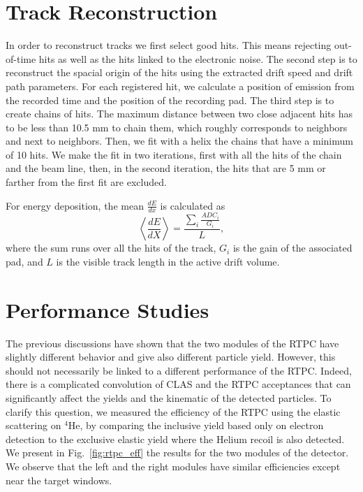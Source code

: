 \documentclass[preprint,5p]{elsarticle}
\begin{document}
\section{Track Reconstruction}\label{sec_rec}
In order to reconstruct tracks we first select good hits. This means rejecting 
out-of-time hits as well as the hits linked to the electronic noise. The second step is 
to reconstruct the spacial origin of the hits using the extracted drift speed and drift path 
parameters. For each registered hit, we calculate a position of emission from 
the recorded time and the position of the recording pad. The third step 
is to create chains of hits. The maximum distance between two close adjacent 
hits has to be less than 10.5 mm to chain them, which roughly corresponds to 
neighbors and next to neighbors. Then, we fit with a helix the chains that have a minimum of 
10 hits. We make the fit in two iterations, first with all the hits of the chain 
and the beam line, then, in the second iteration, 
the hits that are 5 mm or farther from the first fit are excluded.

For energy deposition, the mean $\frac{dE}{dx}$ is calculated as
\begin{equation}
 \left\langle \frac{dE}{dX} \right\rangle= \frac{\sum\limits_{i} \frac{ADC_{i}}{G_i}}{L},
\end{equation}
where the sum runs over all the hits of the track, $G_{i}$ is the gain of 
the associated pad, and $L$ is the visible track length in the active drift 
volume. 

\section{Performance Studies}\label{sec_perfor}

The previous discussions have shown that the two modules of the RTPC have 
slightly different behavior and give also different particle yield. However, 
this should not necessarily be linked to a different performance of the RTPC. 
Indeed, there is a complicated convolution of CLAS and the RTPC acceptances 
that can significantly affect the yields and the kinematic of the detected 
particles. To clarify this question, we measured the 
efficiency of the RTPC using the elastic scattering on $^4$He, by comparing the 
inclusive yield based only on electron detection to the exclusive elastic 
yield where the Helium recoil is also detected. We present in 
Fig.~\ref{fig:rtpc_eff} the results for the two modules 
of the detector. We observe that the left and 
the right modules have similar efficiencies except near the target windows.
\end{document}
